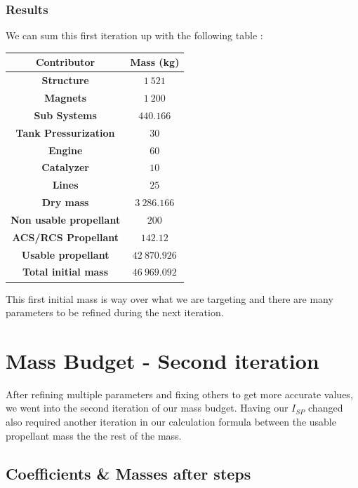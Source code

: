 \subsubsection{Results}
We can sum this first iteration up with the following table :
\begin{center}
	\begin{tabular}[H]{|c|c|}
		\hline
		\cellcolor{gray!50}\textbf{Contributor} & \cellcolor{green!20}\textbf{Mass} (kg)\\
		\hline
		\textbf{Structure} & $1\ 521$\\
		\hline
		\textbf{Magnets} & $1\ 200$\\
		\hline
		\textbf{Sub Systems} & $440.166$\\
		\hline
		\textbf{Tank Pressurization} & $30$\\
		\hline
		\textbf{Engine} & $60$\\
		\hline
		\textbf{Catalyzer} & $10$\\
		\hline
		\textbf{Lines} & $25$\\
		\hline
		\cellcolor{gray!50}\textbf{Dry mass} & \cellcolor{green!20} $3\ 286.166$\\
		\hline
		\textbf{Non usable propellant} & $200$\\
		\hline
		\textbf{ACS/RCS Propellant} & $142. 12$\\
		\hline
		\textbf{Usable propellant} & $42\ 870.926$\\
		\cellcolor{red!50}\textbf{Total initial mass} & \cellcolor{red!50}$46\ 969.092$\\
		\hline 
	\end{tabular}
\end{center}
This first initial mass is way over what we are targeting and there are many parameters to be refined during the next iteration.
\newpage
\section{Mass Budget - Second iteration}
\qquad After refining multiple parameters and fixing others to get more accurate values, we went into the second iteration of our mass budget. Having our $I_{SP}$ changed also required another iteration in our calculation formula between the usable propellant mass the the rest of the mass.
\hypertarget{header-n422}{%
	\subsection{Coefficients \& Masses after steps}\label{header-n422}}

